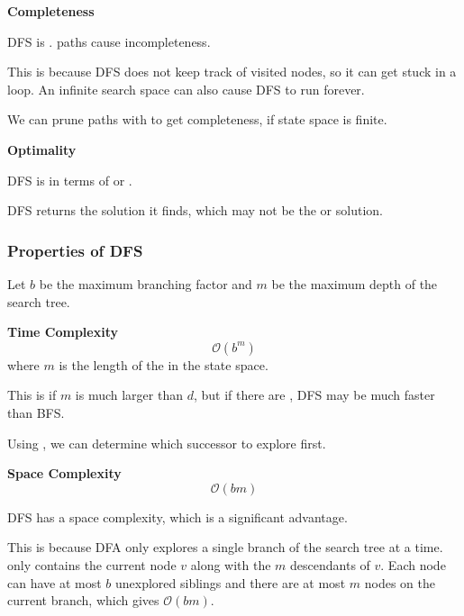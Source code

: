 \begin{listu}
    \item \textbf{Completeness}
    
    \begin{listu}
        \item DFS is .  paths cause incompleteness.
        \item This is because DFS does not keep track of visited nodes, so it can get stuck in a loop. An infinite search space can also cause DFS to run forever.
        \item We can prune paths with  to get completeness, if state space is finite. 
    \end{listu}

    \item \textbf{Optimality}
    
    \begin{listu}
        \item DFS is  in terms of  or .
        \item DFS returns the  solution it finds, which may not be the  or  solution.
    \end{listu}
\end{listu}

\subsubsection{Properties of DFS}

Let $b$ be the maximum branching factor and $m$ be the maximum depth of the search tree.

\begin{listu}
    \item \textbf{Time Complexity} \[
        \mathcal{O}(b^m)
    \] where $m$ is the length of the  in the state space.

    \begin{listu}
        \item This is  if $m$ is much larger than $d$, but if there are , DFS may be much faster than BFS.
        \item Using , we can determine which successor to explore first. 
    \end{listu}

    \item \textbf{Space Complexity} \[
        \mathcal{O}(bm)
    \]
    
    DFS has a  space complexity, which is a significant advantage. 

    This is because DFA only explores a single branch of the search tree at a time. \Frontier only contains the current node $v$ along with the $m$ descendants of $v$.  Each node can have at most $b$ unexplored siblings and there are at most $m$ nodes on the current branch, which gives $\mathcal{O}(bm)$.
\end{listu}

